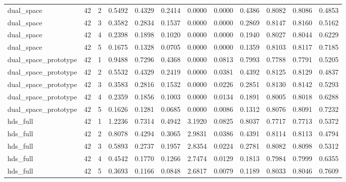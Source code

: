 \begin{tabular}{lrrrrrrrrrrr}
dual\_space & 42 & 2 & 0.5492 & 0.4329 & 0.2414 & 0.0000 & 0.0000 & 0.4386 & 0.8082 & 0.8086 & 0.4853 \\
dual\_space & 42 & 3 & 0.3582 & 0.2834 & 0.1537 & 0.0000 & 0.0000 & 0.2869 & 0.8147 & 0.8160 & 0.5162 \\
dual\_space & 42 & 4 & 0.2398 & 0.1898 & 0.1020 & 0.0000 & 0.0000 & 0.1940 & 0.8027 & 0.8044 & 0.6229 \\
dual\_space & 42 & 5 & 0.1675 & 0.1328 & 0.0705 & 0.0000 & 0.0000 & 0.1359 & 0.8103 & 0.8117 & 0.7185 \\
dual\_space\_prototype & 42 & 1 & 0.9488 & 0.7296 & 0.4368 & 0.0000 & 0.0813 & 0.7993 & 0.7788 & 0.7791 & 0.5205 \\
dual\_space\_prototype & 42 & 2 & 0.5532 & 0.4329 & 0.2419 & 0.0000 & 0.0381 & 0.4392 & 0.8125 & 0.8129 & 0.4837 \\
dual\_space\_prototype & 42 & 3 & 0.3583 & 0.2816 & 0.1532 & 0.0000 & 0.0226 & 0.2851 & 0.8130 & 0.8142 & 0.5293 \\
dual\_space\_prototype & 42 & 4 & 0.2359 & 0.1856 & 0.1003 & 0.0000 & 0.0134 & 0.1891 & 0.8005 & 0.8018 & 0.6288 \\
dual\_space\_prototype & 42 & 5 & 0.1626 & 0.1281 & 0.0685 & 0.0000 & 0.0086 & 0.1312 & 0.8076 & 0.8091 & 0.7232 \\
hds\_full & 42 & 1 & 1.2236 & 0.7314 & 0.4942 & 3.1920 & 0.0825 & 0.8037 & 0.7717 & 0.7713 & 0.5372 \\
hds\_full & 42 & 2 & 0.8078 & 0.4294 & 0.3065 & 2.9831 & 0.0386 & 0.4391 & 0.8114 & 0.8113 & 0.4794 \\
hds\_full & 42 & 3 & 0.5893 & 0.2737 & 0.1957 & 2.8354 & 0.0224 & 0.2781 & 0.8082 & 0.8098 & 0.5312 \\
hds\_full & 42 & 4 & 0.4542 & 0.1770 & 0.1266 & 2.7474 & 0.0129 & 0.1813 & 0.7984 & 0.7999 & 0.6355 \\
hds\_full & 42 & 5 & 0.3693 & 0.1166 & 0.0848 & 2.6817 & 0.0079 & 0.1189 & 0.8033 & 0.8046 & 0.7609 \\
\bottomrule
\end{tabular}
